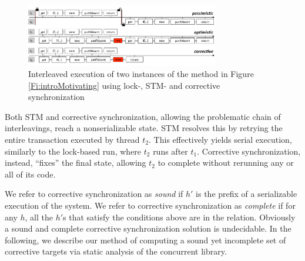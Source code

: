 \begin{figure}
	\begin{center}
	\includegraphics[width=0.75\textwidth]{OverviewSlide.pdf}
	\end{center}
	\caption{\label{Fi:motivatingOverview}Interleaved execution of two instances of the method in Figure \ref{Fi:introMotivating} using lock-, STM- and corrective synchronization}
\end{figure}

Both STM and corrective synchronization, allowing the problematic chain of interleavings, reach a nonserializable state. STM resolves this by retrying the entire transaction executed by thread $t_2$. This effectively yields serial execution, similarly to the lock-based run, where $t_2$ runs after $t_1$. Corrective synchronization, instead, ``fixes'' the final state, allowing $t_2$ to complete without rerunning any or all of its code.

We refer to corrective synchronization as \emph{sound} if $h'$ is the prefix of a serializable execution of the system. We refer to corrective synchronization as \emph{complete} if for any $h$, all the $h'$s that satisfy the conditions above are in the relation. Obviously a sound and complete corrective synchronization solution is undecidable. In the following, we describe our method of computing a sound yet incomplete set of corrective targets via static analysis of the concurrent library.


